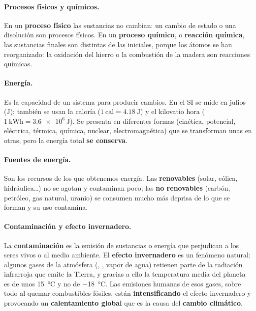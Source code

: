\paragraph{Procesos físicos y químicos.} En un \textbf{proceso físico} las sustancias no cambian: un cambio de estado o una
disolución son procesos físicos. En un \textbf{proceso químico}, o \textbf{reacción química}, las sustancias finales son distintas
de las iniciales, porque los átomos se han reorganizado: la oxidación del hierro o la combustión de la madera son reacciones
químicas.

\paragraph{Energía.} Es la capacidad de un sistema para producir cambios. En el SI se mide en julios (J); también se usan la
caloría (\(1~\mathrm{cal} = \qty{4.18}{\joule}\)) y el kilovatio hora (\(\qty{1}{\kilo\watt\hour} = \qty{3.6e6}{\joule}\)). Se
presenta en diferentes formas (cinética, potencial, eléctrica, térmica, química, nuclear, electromagnética) que se transforman unas
en otras, pero la energía total \textbf{se conserva}.

\paragraph{Fuentes de energía.} Son los recursos de los que obtenemos energía. Las \textbf{renovables} (solar, eólica,
hidráulica…) no se agotan y contaminan poco; las \textbf{no renovables} (carbón, petróleo, gas natural, uranio) se consumen mucho
más deprisa de lo que se forman y su uso contamina.

\paragraph{Contaminación y efecto invernadero.} La \textbf{contaminación} es la emisión de sustancias o energía que perjudican a
los seres vivos o al medio ambiente. El \textbf{efecto invernadero} es un fenómeno natural: algunos gases de la atmósfera
(, , vapor de agua) retienen parte de la radiación infrarroja que emite la Tierra, y gracias a ello la temperatura
media del planeta es de unos \qty{15}{\degreeCelsius} y no de \qty{-18}{\degreeCelsius}. Las emisiones humanas de esos gases,
sobre todo al quemar combustibles fósiles, están \textbf{intensificando} el efecto invernadero y provocando un
\textbf{calentamiento global} que es la causa del \textbf{cambio climático}.

